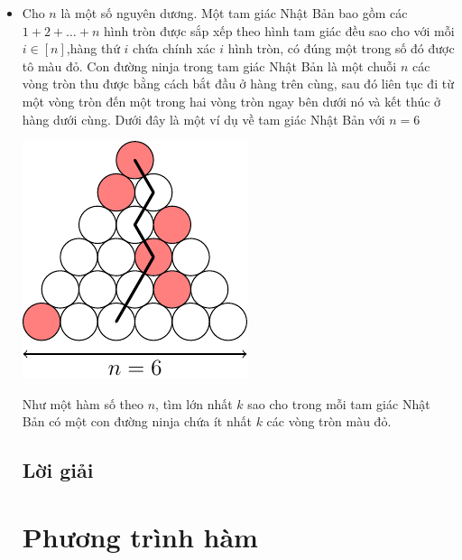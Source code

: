 \documentclass[11pt]{scrartcl}
\begin{document}
\begin{itemize}[label=, leftmargin=0em, itemsep=-0em]
    \item \begin{btvn}
        Cho $n$ là một số nguyên dương. Một tam giác Nhật Bản bao gồm các $1 + 2 + \dots + n$ hình tròn được sắp xếp theo hình tam giác đều sao cho với mỗi $i \in [n]$,hàng thứ $i$ chứa chính xác $i$ hình tròn, có đúng một trong số đó được tô màu đỏ. Con đường ninja trong tam giác Nhật Bản là một chuỗi $n$ các vòng tròn thu được bằng cách bắt đầu ở hàng trên cùng, sau đó liên tục đi từ một vòng tròn đến một trong hai vòng tròn ngay bên dưới nó và kết thúc ở hàng dưới cùng. Dưới đây là một ví dụ về tam giác Nhật Bản với $n = 6$
        \begin{center}
            \includegraphics[scale=1]{IMO2023.pdf}
        \end{center}
  Như một hàm số theo $n$, tìm lớn nhất $k$ sao cho trong mỗi tam giác Nhật Bản có một con đường ninja chứa ít nhất $k$ các vòng tròn màu đỏ.
    \end{btvn}
    \subsection{\LARGE \textcolor{dk}{Lời giải}}

    \newpage
    \thispagestyle{plain}
    
    \section{\huge Phương trình hàm}

\end{itemize}
\end{document}
